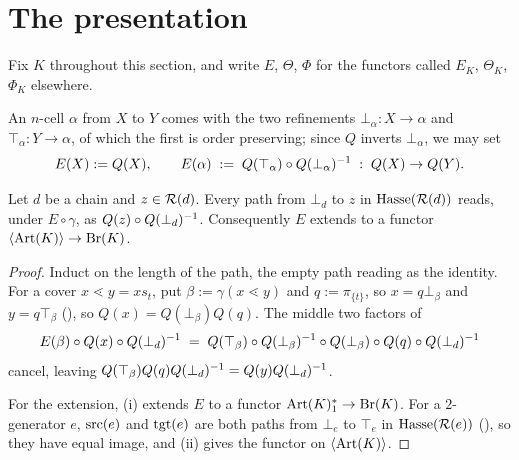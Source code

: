 \documentclass[11pt]{article}
\begin{document}
\section{The presentation}\label{sec:thmA}


Fix $K$ throughout this section, and write $E$, $\Theta$, $\Phi$ for the functors called $E_K$,
$\Theta_K$, $\Phi_K$ elsewhere.


An $n$-cell $\alpha$ from $X$ to $Y$ comes with the two refinements $\bot_\alpha : X \to \alpha$ and
$\top_\alpha : Y \to \alpha$, of which the first is order preserving; since $Q$ inverts
$\bot_\alpha$, we may set
\[
  E(X) := Q(X), \qquad
  E(\alpha) \;:=\; Q(\top_\alpha) \circ Q(\bot_\alpha)^{-1} \;:\; Q(X) \to Q(Y) .
\]

\begin{lemma}\label{lem:telescope}
  Let $d$ be a chain and $z \in \mathcal{R}(d)$. Every path from $\bot_d$ to $z$ in
  $\mathrm{Hasse}(\mathcal{R}(d))$ reads, under $E \circ \gamma$, as
  $Q(z) \circ Q(\bot_d)^{-1}$. Consequently $E$ extends to a functor
  $\left\langle \operatorname{Art}(K) \right\rangle \to \operatorname{Br}(K)$.
\end{lemma}
\begin{proof}
  Induct on the length of the path, the empty path reading as the identity. For a cover
  $x \lessdot y = xs_t$, put $\beta := \gamma(x \lessdot y)$ and $q := \pi_{\{t\}}$, so
  $x = q\bot_\beta$ and $y = q\top_\beta$ (), so $Q(x) = Q(\bot_\beta)Q(q)$.
  The middle two factors of
  \[
    E(\beta) \circ Q(x) \circ Q(\bot_d)^{-1}
      \;=\; Q(\top_\beta) \circ Q(\bot_\beta)^{-1} \circ Q(\bot_\beta) \circ Q(q)
            \circ Q(\bot_d)^{-1}
  \]
  cancel, leaving $Q(\top_\beta)Q(q)Q(\bot_d)^{-1} = Q(y)Q(\bot_d)^{-1}$.

  For the extension, (i) extends $E$ to a functor
  $\operatorname{Art}(K)_1^* \to \operatorname{Br}(K)$. For a $2$-generator $e$, $\operatorname{src}(e)$ and $\operatorname{tgt}(e)$ are both paths from
  $\bot_e$ to $\top_e$ in $\mathrm{Hasse}(\mathcal{R}(e))$ (), so they have equal
  image, and (ii) gives the functor on $\left\langle \operatorname{Art}(K) \right\rangle$.
\end{proof}
\end{document}
